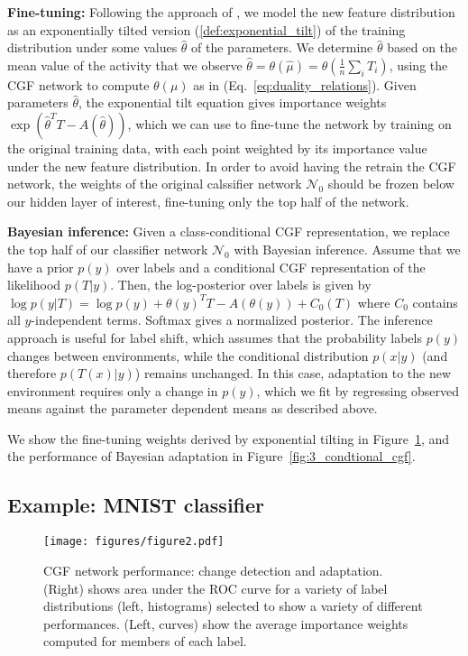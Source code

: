 \documentclass{article}      %
\begin{document}
\textbf{Fine-tuning:} Following the approach of \cite{maity_understanding_2023}, we model the new feature distribution as an exponentially tilted version (\ref{def:exponential_tilt}) of the training distribution  under some values $\hat \theta$ of the parameters.
We determine $\hat \theta$ based on the mean value of the activity that we observe ${\hat \theta = \theta(\hat \mu) = \theta(\frac{1}{n} \sum_i T_i)}$, using the CGF network to compute $\theta(\mu)$ as in (Eq.~\ref{eq:duality_relations}).
Given parameters $\hat \theta$, the exponential tilt equation gives importance weights ${\exp(\hat \theta^T T - A(\hat \theta))}$, which we can use to fine-tune the network by training on the original training data, with each point weighted by its importance value under the new feature distribution.
In order to avoid having the retrain the CGF network, the weights of the original calssifier network $\mathcal{N}_0$ should be frozen below our hidden layer of interest, fine-tuning only the top half of the network.


\textbf{Bayesian inference:}
Given a class-conditional CGF representation, we replace the top half of our classifier network $\mathcal{N}_0$ with Bayesian inference.
Assume that we have a prior $p(y)$ over labels and a conditional CGF representation of the likelihood $p(T|y)$.
Then, the log-posterior over labels is given by ${\log p(y|T) = \log p(y) + \theta(y)^T T - A(\theta(y)) + C_0(T)}$ where $C_0$ contains all $y$-independent terms.
Softmax gives a normalized posterior.
The inference approach is useful for label shift, which assumes that the probability labels $p(y)$ changes between environments, while the conditional distribution $p(x|y)$ (and therefore $p(T(x)|y)$) remains unchanged.
In this case, adaptation to the new environment requires only a change in $p(y)$, which we fit by regressing observed means against the parameter dependent means as described above.

We show the fine-tuning weights derived by exponential tilting in Figure~\ref{fig:2_change_detection}, and the performance of Bayesian adaptation in Figure~\ref{fig:3_condtional_cgf}.

\subsection{Example: MNIST classifier}
\begin{figure}[tbh!]
  \centering
  \texttt{[image: figures/figure2.pdf]}
  \caption{CGF network performance: change detection and adaptation. (Right) shows area under the ROC curve for a variety of label distributions (left, histograms) selected to show a variety of different performances. (Left, curves) show the average importance weights computed for members of each label.}
  \label{fig:2_change_detection}
\end{figure}
\end{document}
